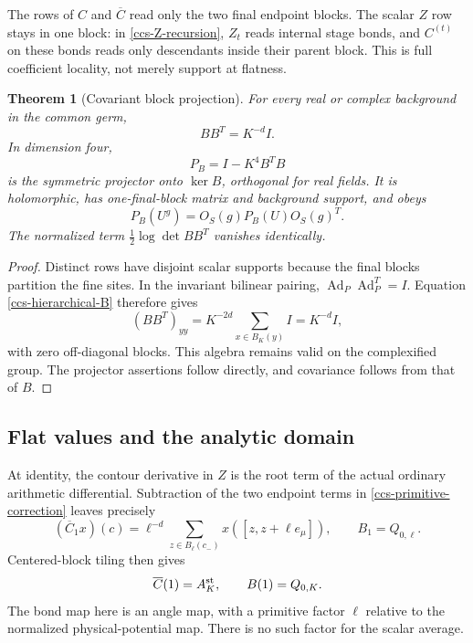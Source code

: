 \documentclass[11pt]{article}
\newtheorem{theorem}{Theorem}[section]
\theoremstyle{remark}
\begin{document}
The rows of \(C\) and \(\overline C\) read only the two final
endpoint blocks. The scalar \(Z\) row stays in one block:
in \eqref{ccs-Z-recursion}, \(Z_t\) reads internal stage bonds,
and \(C^{(t)}\) on these bonds reads only descendants inside
their parent block. This is full coefficient locality, not
merely support at flatness.

\begin{theorem}[Covariant block projection]
\label{ccs-projector-theorem}
For every real or complex background in the common germ,
\begin{equation}
                 BB^T=K^{-d}I.
 \label{ccs-row-Gram}
\end{equation}
In dimension four,
\begin{equation}
                  P_B=I-K^4B^TB
 \label{ccs-projector}
\end{equation}
is the symmetric projector onto \(\ker B\), orthogonal for
real fields. It is holomorphic, has one-final-block matrix
and background support, and obeys
\begin{equation}
          P_B(U^g)=O_S(g)P_B(U)O_S(g)^T.
 \label{ccs-projector-covariance}
\end{equation}
The normalized term \(\frac12\log\det BB^T\) vanishes identically.
\end{theorem}

\begin{proof}
Distinct rows have disjoint scalar supports because the final
blocks partition the fine sites. In the invariant bilinear
pairing,
\(\operatorname{Ad}_P\operatorname{Ad}_P^T=I\).
Equation \eqref{ccs-hierarchical-B} therefore gives
\[
 (BB^T)_{yy}
      =K^{-2d}\sum_{x\in B_K(y)}I=K^{-d}I,
\]
with zero off-diagonal blocks. This algebra remains valid on
the complexified group. The projector assertions follow
directly, and covariance follows from that of \(B\).
\end{proof}

\subsection{Flat values and the analytic domain}
\label{ccs-analytic-section}

At identity, the contour derivative in \(Z\) is the root term
of the actual ordinary arithmetic differential. Subtraction
of the two endpoint terms in
\eqref{ccs-primitive-correction} leaves precisely
\begin{equation}
 (\overline C_1x)(c)=\ell^{-d}
       \sum_{z\in B_\ell(c_-)}x([z,z+\ell e_\mu]),
 \qquad B_1=Q_{0,\ell}.
 \label{ccs-flat-primitive}
\end{equation}
Centered-block tiling then gives
\begin{equation}
             \overline C(1)=A_K^{\rm st},\qquad
                         B(1)=Q_{0,K}.
 \label{ccs-flat-composite}
\end{equation}
The bond map here is an angle map, with a primitive factor
\(\ell\) relative to the normalized physical-potential map.
There is no such factor for the scalar average.
\end{document}
